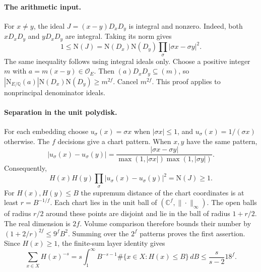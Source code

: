 \documentclass[11pt,letterpaper]{article}
\begin{document}
\paragraph{The arithmetic input.}
For $x\ne y$, the ideal $J=(x-y)D_xD_y$ is integral and nonzero.
Indeed, both $xD_xD_y$ and $yD_xD_y$ are integral. Taking its norm gives
\[
 1\le\mathrm N(J)
   =\mathrm N(D_x)\mathrm N(D_y)\prod_\sigma|\sigma x-\sigma y|^2 .
\]
The same inequality follows using integral ideals only. Choose a positive
integer $m$ with $a=m(x-y)\in\mathcal O_E$. Then
$(a)D_xD_y\subseteq(m)$, so
$|\mathrm N_{E/\mathbb Q}(a)|\mathrm N(D_x)\mathrm N(D_y)\ge m^{2f}$.
Cancel $m^{2f}$. This proof applies to nonprincipal denominator ideals.

\paragraph{Separation in the unit polydisk.}
For each embedding choose $u_\sigma(x)=\sigma x$ when $|\sigma x|\le1$,
and $u_\sigma(x)=1/(\sigma x)$ otherwise. The $f$ decisions give a chart
pattern. When $x,y$ have the same pattern,
\[
 |u_\sigma(x)-u_\sigma(y)|
 =\frac{|\sigma x-\sigma y|}
          {\max(1,|\sigma x|)\max(1,|\sigma y|)} .
\]
Consequently,
\[
 H(x)H(y)\prod_\sigma |u_\sigma(x)-u_\sigma(y)|^2=\mathrm N(J)\ge1.
\]
For $H(x),H(y)\le B$ the supremum distance of the chart coordinates
is at least $r=B^{-1/f}$. Each chart lies in the unit ball of
$(\mathbb C^f,\|\cdot\|_\infty)$. The open balls of radius $r/2$ around
these points are disjoint and lie in the ball of radius $1+r/2$. The real
dimension is $2f$. Volume comparison therefore bounds their number by
$(1+2/r)^{2f}\le9^f B^2$. Summing over the $2^f$ patterns proves the
first assertion. Since $H(x)\ge1$, the finite-sum layer identity gives
\[
 \sum_{x\in X}H(x)^{-s}
 =s\int_1^\infty\! B^{-s-1}\#\{x\in X:H(x)\le B\}\,dB
 \le\frac{s}{s-2}18^f .
\]
\end{document}
